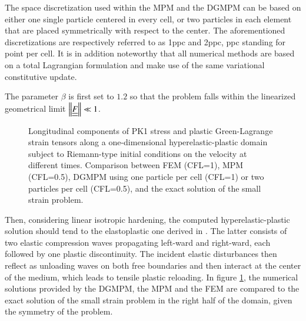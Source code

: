 The space discretization used within the MPM and the DGMPM can be based on either one single particle centered in every cell, or two particles in each element that are placed symmetrically with respect to the center.
The aforementioned discretizations are respectively referred to as 1ppc and 2ppc, ppc standing for point per cell.
It is in addition noteworthy that all numerical methods are based on a total Lagrangian formulation and make use of the same variational constitutive update.

The parameter $\beta$ is first set to $1.2$ so that the problem falls within the linearized geometrical limit $\left\Vert{\underline{\underline{F}}}\right\Vert \ll 1$.
\begin{figure}[h!]
  \centering
  {}
  {}
  {}
  
  \caption{Longitudinal components of PK1 stress and plastic Green-Lagrange strain tensors along a one-dimensional hyperelastic-plastic domain subject to Riemann-type initial conditions on the velocity at different times. Comparison between FEM (CFL=1), MPM (CFL=0.5), DGMPM using one particle per cell (CFL=1) or two particles per cell (CFL=0.5), and the exact solution of the small strain problem.}
  \label{fig:hep_planeWave}
\end{figure}
Then, considering linear isotropic hardening, the computed hyperelastic-plastic solution should tend to the elastoplastic one derived in \cite{Thomas_EP}.
The latter consists of two elastic compression waves propagating left-ward and right-ward, each followed by one plastic discontinuity.
The incident elastic disturbances then reflect as unloading waves on both free boundaries and then interact at the center of the medium, which leads to tensile plastic reloading.
In figure \ref{fig:hep_planeWave}, the numerical solutions provided by the DGMPM, the MPM and the FEM are compared to the exact solution of the small strain problem in the right half of the domain, given the symmetry of the problem.
